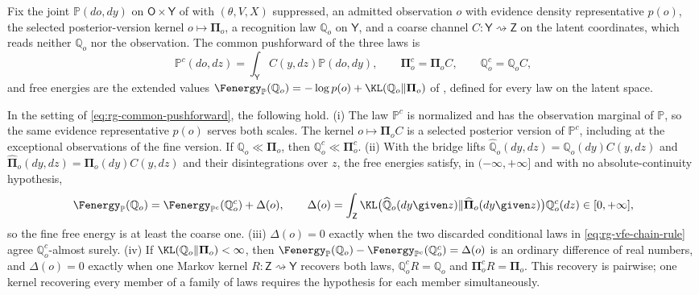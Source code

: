 Fix the joint $\mathbb P(do,dy)$ on $\mathsf O\times\mathsf Y$ of  with
$(\theta,V,X)$ suppressed, an admitted observation $o$ with evidence density representative $p(o)$,
the selected posterior-version kernel $o\mapsto\boldsymbol\Pi_o$, a recognition law $\mathbb Q_o$ on
$\mathsf Y$, and a coarse channel $C:\mathsf Y\rightsquigarrow\mathsf Z$ on the latent coordinates,
which reads neither $\mathbb Q_o$ nor the observation. The common pushforward of the three laws is
\begin{equation}
\mathbb P^c(do,dz)=\int_{\mathsf Y}C(y,dz)\mathbb P(do,dy),
\qquad
\boldsymbol\Pi^c_o=\boldsymbol\Pi_oC,
\qquad
\mathbb Q^c_o=\mathbb Q_oC,
\label{eq:rg-common-pushforward}
\end{equation}
and free energies are the extended values $\Fenergy_{\mathbb P}(\mathbb Q_o)=-\log p(o)
+\KL(\mathbb Q_o\Vert\boldsymbol\Pi_o)$ of , defined for every law on the
latent space.

\label{eq:rg-bridge-lifts}
In the setting of \eqref{eq:rg-common-pushforward}, the following hold. (i) The law $\mathbb P^c$
is normalized and has the observation marginal of $\mathbb P$, so the same evidence representative
$p(o)$ serves both scales. The kernel $o\mapsto\boldsymbol\Pi_oC$ is a selected posterior version of
$\mathbb P^c$, including at the exceptional observations of the fine version. If
$\mathbb Q_o\ll\boldsymbol\Pi_o$, then $\mathbb Q^c_o\ll\boldsymbol\Pi^c_o$. (ii) With the bridge
lifts $\widehat{\mathbb Q}_o(dy,dz)=\mathbb Q_o(dy)C(y,dz)$ and
$\widehat{\boldsymbol\Pi}_o(dy,dz)=\boldsymbol\Pi_o(dy)C(y,dz)$ and their disintegrations over $z$,
the free energies satisfy, in $(-\infty,+\infty]$ and with no absolute-continuity hypothesis,
\begin{equation}
\Fenergy_{\mathbb P}(\mathbb Q_o)
=\Fenergy_{\mathbb P^c}(\mathbb Q^c_o)+\Delta(o),
\qquad
\Delta(o)=\int_{\mathsf Z}
\KL\bigl(\widehat{\mathbb Q}_o(dy\given z)\Vert\widehat{\boldsymbol\Pi}_o(dy\given z)\bigr)
\mathbb Q^c_o(dz)\in[0,+\infty],
\label{eq:rg-vfe-chain-rule}
\end{equation}
so the fine free energy is at least the coarse one. (iii) $\Delta(o)=0$ exactly when the two
discarded conditional laws in \eqref{eq:rg-vfe-chain-rule} agree $\mathbb Q^c_o$-almost surely.
(iv) If $\KL(\mathbb Q_o\Vert\boldsymbol\Pi_o)<\infty$, then
$\Fenergy_{\mathbb P}(\mathbb Q_o)-\Fenergy_{\mathbb P^c}(\mathbb Q^c_o)=\Delta(o)$ is an
ordinary difference of real numbers, and $\Delta(o)=0$ exactly when one Markov kernel
$R:\mathsf Z\rightsquigarrow\mathsf Y$ recovers both laws, $\mathbb Q^c_oR=\mathbb Q_o$ and
$\boldsymbol\Pi^c_oR=\boldsymbol\Pi_o$. This recovery is pairwise; one kernel recovering every
member of a family of laws requires the hypothesis for each member simultaneously.

